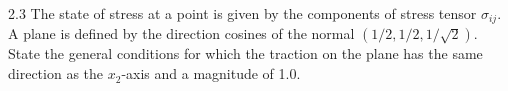 
\begin{problem}{2.3}
  The state of stress at a point is given by the components of stress tensor $\sigma_{ij}$.
  A plane is defined by the direction cosines of the normal $\left( 1 / 2, 1 / 2, 1 / \sqrt{2} \right)$.
  State the general conditions for which the traction on the plane has the same direction as the $x_2$-axis and a magnitude of \num{1,0}.
\end{problem}

